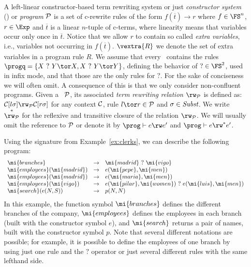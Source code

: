 A {left-linear constructor-based term rewriting system} or just \emph{constructor system} (\emph{\ctrs}) or \emph{program} ${\cal P}$ is a set of c-rewrite rules of the form $f(\overline{t})\to r$ where $f\in \FS^n$, $r\in \Exp$ and $\overline{t}$ is a linear $n$-tuple of c-terms, where linearity means that variables occur only once in $\overline{t}$. Notice that we allow $r$ to contain so called \emph{extra variables}, i.e., variables not occurring in $f(\overline{t})$. 
  $\vextra{R}$ we denote
the set of extra variables in a program rule $R$. 
We assume that every \ctrs\ contains the rules $\progq = \{X~?~Y \tor X, X~?~Y \tor Y\}$, defining the behavior of $? \in \FS^2$, used in infix mode, and that those are the only rules for $?$.  For the sake of conciseness we will often omit.  A consequence of this is that we only consider non-confluent programs. Given a \trs\ ${\cal P}$, its associated \emph{term rewriting relation} $\rw_{\cal P}$ is defined as:
${\cal C}[l\sigma] \rw_{\cal P} {\cal C}[r\sigma]$
for any context ${\cal C}$, rule $l \tor r \in {\cal P}$ and $\sigma \in
\emph{Subst}$. We write $\stackrel{*}{\rw_{\cal P}}$ for the reflexive and
transitive closure of the relation $\rw_{\cal P}$. We will usually omit the reference to ${\cal  P}$ or denote it by $\prog \vdash e \rw e'$ and $\prog \vdash e \rw^* e'$.  

\begin{example}\label{ex:rules}
Using the signature from Example~\ref{ex:clerks}, we can describe the following
program:
$$
\begin{array}{lll}
  \mi{branches} & \to & \mi{madrid}\ ?\ \mi{vigo}\\
  \mi{employees}(\mi{madrid}) & \to & e(\mi{pepe}, \mi{men})\\
  \mi{employees}(\mi{madrid}) & \to & e(\mi{maria}, \mi{men})\\
  \mi{employees}(\mi{vigo}) & \to & e(\mi{pilar}, \mi{women})\ ?\ e(\mi{luis}, \mi{men})\\
\mi{search}(e(N,S)) & \to & p(N,N)
\end{array}
$$
In this example, the function symbol $\mi{branches}$ defines the different branches of the
company, $\mi{employees}$ defines the employees in each branch (built with the constructor
symbol $e$), and $\mi{search}$ returns a pair of names, built with the constructor symbol $p$.
Note that several different notations are possible; for example, it is possible to define
the employees of one branch by using just one rule and the $?$ operator or just several
different rules with the same lefthand side. 
\end{example}



